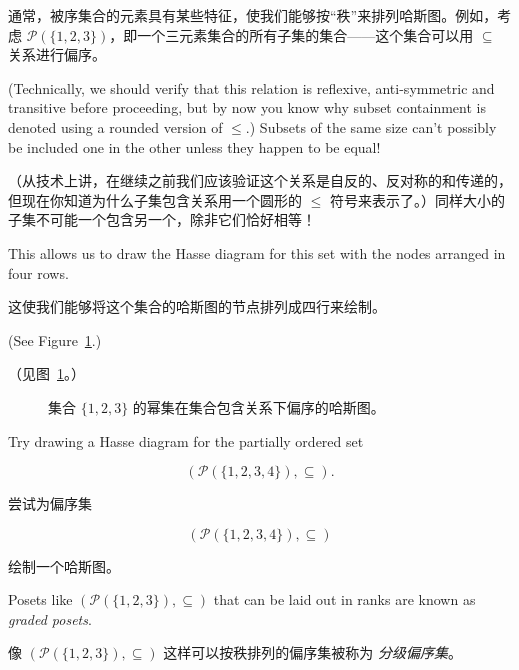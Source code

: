 通常，被序集合的元素具有某些特征，使我们能够按“秩”来排列哈斯图。例如，考虑 ${\mathcal P}(\{1,2,3\})$，即一个三元素集合的所有子集的集合——这个集合可以用 $\subseteq$ 关系进行偏序。

(Technically, we should verify that this relation is reflexive,
anti-symmetric and transitive before proceeding, but by now you know
why subset containment is denoted using a rounded version of $\leq$.)
Subsets of the same size can't possibly be included one in the other
unless they happen to be equal!

（从技术上讲，在继续之前我们应该验证这个关系是自反的、反对称的和传递的，但现在你知道为什么子集包含关系用一个圆形的 $\leq$ 符号来表示了。）同样大小的子集不可能一个包含另一个，除非它们恰好相等！

This allows us to draw the Hasse 
diagram for this set with the nodes arranged in four rows.

这使我们能够将这个集合的哈斯图的节点排列成四行来绘制。

(See Figure~\ref{fig:subset_hasse}.)  

（见图~\ref{fig:subset_hasse}。）

\begin{figure}[!hbtp]

\caption[Hasse diagram for $({\mathcal P}(\{1,2,3\}), \subseteq)$.]{Hasse %
diagram for the power set of $\{1,2,3\}$ partially ordered by %
set containment.}
\caption[$({\mathcal P}(\{1,2,3\}), \subseteq)$ 的哈斯图。]{集合 $\{1,2,3\}$ 的幂集在集合包含关系下偏序的哈斯图。}
\label{fig:subset_hasse} 
\end{figure}

\begin{exer}
Try drawing a Hasse diagram for the partially ordered set 

\[ ({\mathcal P}(\{1,2,3,4\}),\subseteq). \]

\end{exer}

\begin{exer}
尝试为偏序集

\[ ({\mathcal P}(\{1,2,3,4\}),\subseteq) \]

绘制一个哈斯图。
\end{exer}


Posets like $({\mathcal P}(\{1,2,3\}), \subseteq)$ that can be laid out
in ranks are known as  \emph{graded posets}.

像 $({\mathcal P}(\{1,2,3\}), \subseteq)$ 这样可以按秩排列的偏序集被称为  \emph{分级偏序集}。

